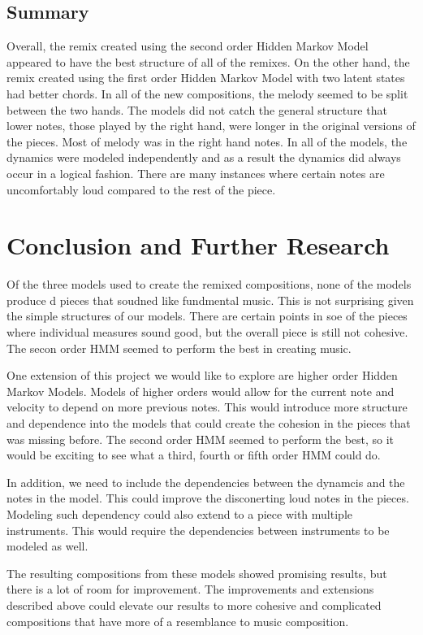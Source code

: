 \documentclass{article} %
\begin{document}
\subsection{Summary}
Overall, the remix created using the second order Hidden Markov Model appeared to have the best structure of all of the remixes. On the other hand, the remix created using the first order Hidden Markov Model with two latent states had better chords. In all of the new compositions, the melody seemed to be split between the two hands. The models did not catch the general structure that lower notes, those played by the right hand, were longer in the original versions of the pieces. Most of melody was in the right hand notes. In all of the models, the dynamics were modeled independently and as a result the dynamics did always occur in a logical fashion. There are many instances where certain notes are uncomfortably loud compared to the rest of the piece. 

\section{Conclusion and Further Research}

Of the three models used to create the remixed compositions, none of the models produce d pieces that soudned like fundmental music. This is not surprising given the simple structures of our models. There are certain points in soe of the pieces where individual measures sound good, but the overall piece is still not cohesive. The secon order HMM seemed to perform the best in creating music. 

One extension of this project we would like to explore are higher order Hidden Markov Models. Models of higher orders would allow for the current note and velocity to depend on more previous notes. This would introduce more structure and dependence into the models that could create the cohesion in the pieces that was missing before. The second order HMM seemed to perform the best, so it would be exciting to see what a third, fourth or fifth order HMM could do. 

In addition, we need to include the dependencies between the dynamcis and the notes in the model. This could improve the disconerting loud notes in the pieces. Modeling such dependency could also extend to a piece with multiple instruments. This would require the dependencies between instruments to be modeled as well. 

The resulting compositions from these models showed promising results, but there is a lot of room for improvement. The improvements and extensions described above could elevate our results to more cohesive and complicated compositions that have more of a resemblance to music composition. 
\end{document}
